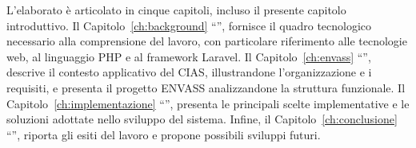 L’elaborato è articolato in cinque capitoli, incluso il presente capitolo introduttivo. Il Capitolo~\ref{ch:background} ``'', fornisce il quadro tecnologico necessario alla comprensione del lavoro, con particolare riferimento alle tecnologie web, al linguaggio PHP e al framework Laravel. Il Capitolo~\ref{ch:envass} ``'', descrive il contesto applicativo del CIAS, illustrandone l’organizzazione e i requisiti, e presenta il progetto ENVASS analizzandone la struttura funzionale. Il Capitolo~\ref{ch:implementazione} ``'', presenta le principali scelte implementative e le soluzioni adottate nello sviluppo del sistema. Infine, il Capitolo~\ref{ch:conclusione} ``'', riporta gli esiti del lavoro e propone possibili sviluppi futuri.








